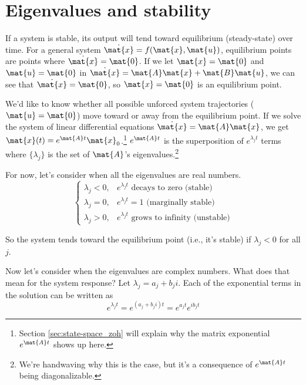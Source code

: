 \section{Eigenvalues and stability}

If a system is stable, its output will tend toward equilibrium (steady-state)
over time. For a general system $\dot{\mat{x}} = f(\mat{x}, \mat{u})$,
equilibrium points are points where $\dot{\mat{x}} = \mat{0}$. If we let
$\mat{x} = \mat{0}$ and $\mat{u} = \mat{0}$ in
$\dot{\mat{x}} = \mat{A}\mat{x} + \mat{B}\mat{u}$, we can see that
$\dot{\mat{x}} = \mat{0}$, so $\mat{x} = \mat{0}$ is an equilibrium point.

We'd like to know whether all possible unforced system trajectories
($\mat{u} = \mat{0}$) move toward or away from the equilibrium point. If we
solve the system of linear differential equations
$\dot{\mat{x}} = \mat{A}\mat{x}$, we get
$\mat{x}(t) = e^{\mat{A}t} \mat{x}_0$.\footnote{Section
\ref{sec:state-space_zoh} will explain why the matrix exponential $e^{\mat{A}t}$
shows up here.} $e^{\mat{A}t}$ is the superposition of $e^{\lambda_j t}$ terms
where $\{\lambda_j\}$ is the set of $\mat{A}$'s eigenvalues.\footnote{We're
handwaving why this is the case, but it's a consequence of $e^{\mat{A}t}$ being
diagonalizable.}

For now, let's consider when all the eigenvalues are real numbers.
\begin{equation*}
  \begin{cases}
    \lambda_j < 0, & e^{\lambda_j t} \text{ decays to zero (stable)}
      \\
    \lambda_j = 0, & e^{\lambda_j t} = 1 \text{ (marginally stable)} \\
    \lambda_j > 0, & e^{\lambda_j t} \text{ grows to infinity (unstable)}
  \end{cases}
\end{equation*}

So the system tends toward the equilibrium point (i.e., it's stable) if
$\lambda_j < 0$ for all $j$.

Now let's consider when the eigenvalues are complex numbers. What does that mean
for the system response? Let $\lambda_j = a_j + b_j i$. Each of the exponential
terms in the solution can be written as
\begin{equation*}
  e^{\lambda_j t} = e^{(a_j + b_j i)t} = e^{a_j t} e^{i b_j t}
\end{equation*}

